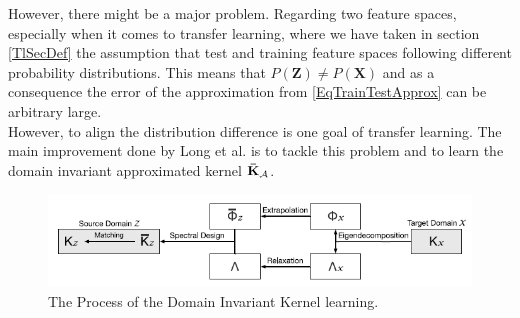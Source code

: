 However, there might be a major problem.
Regarding two feature spaces, especially when it comes to transfer learning, where we have taken in section \ref{TlSecDef} the assumption that test and training feature spaces following different probability distributions.
This means that $P(\mathbf{Z})\neq P(\mathbf{X})$ and as a consequence the error of the approximation from \eqref{EqTrainTestApprox} can be arbitrary large.\cite{Long.2015}\\
However, to align the distribution difference is one goal of transfer learning.
The main improvement done by Long et al. is to tackle this problem and to learn the domain invariant approximated kernel $\mathbf{\bar{K}}_{\mathcal{A}}$.\cite{Long.2015}
\begin{figure}
	\centering
	\includegraphics[width=.8\linewidth]{figures/ProcessTKL.png}
	\caption[Tranfer Kernel Learning Process]{The Process of the Domain Invariant Kernel learning.\cite{Long.2015}}
	\label{FigTKLApp}
\end{figure}
